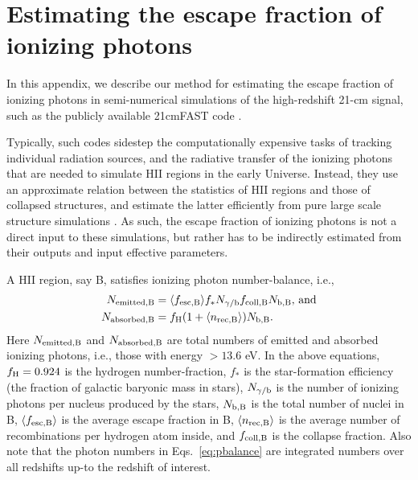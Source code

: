 \section{Estimating the escape fraction of ionizing photons}

In this appendix, we describe our method for estimating the escape fraction of ionizing photons in semi-numerical  simulations of the high-redshift 21-cm signal, such as the publicly available 21cmFAST code \cite{2011MNRAS.411..955M}. 

Typically, such codes sidestep the computationally expensive tasks of tracking individual radiation sources, and the radiative transfer of the ionizing photons that are needed to simulate HII regions in the early Universe. Instead, they use an approximate relation between the statistics of HII regions and those of collapsed structures, and estimate the latter efficiently from pure large scale structure simulations \cite{2004ApJ...613....1F}. As such, the escape fraction of ionizing photons is not a direct input to these simulations, but rather has to be indirectly estimated from their outputs and input effective parameters. 

A HII region, say B, satisfies ionizing photon number-balance, i.e., 
\begin{subequations}
\label{eq:pbalance}
  \begin{align}
    N_{\rm emitted, B} & = \langle f_{\rm esc, B} \rangle f_\ast N_{\gamma/{\rm b}} f_{\rm coll, B} N_{\rm b, B} \mbox{, and} \label{eq:emission} \\
    N_{\rm absorbed, B} & = f_{\rm H} (1 + \langle n_{\rm rec, B} \rangle) N_{\rm b, B} \label{eq:absorption} \mbox{.}
  \end{align}
\end{subequations}
Here $N_{\rm emitted, B}$ and $N_{\rm absorbed, B}$ are total numbers of emitted and absorbed ionizing photons, i.e., those with energy $> 13.6$ eV. In the above equations, $f_{\rm H} = 0.924$ is the hydrogen number-fraction, $f_\ast$ is the star-formation efficiency (the fraction of galactic baryonic mass in stars), $N_{\gamma/{\rm b}}$ is the number of ionizing photons per nucleus produced by the stars, $N_{\rm b, B}$ is the total number of nuclei in B, $\langle f_{\rm esc, B} \rangle$ is the average escape fraction in B, $\langle n_{\rm rec, B} \rangle$ is the average number of recombinations per hydrogen atom inside, and $f_{\rm coll, B}$ is the collapse fraction. Also note that the photon numbers in Eqs.~\eqref{eq:pbalance} are integrated numbers over all redshifts up-to the redshift of interest.

